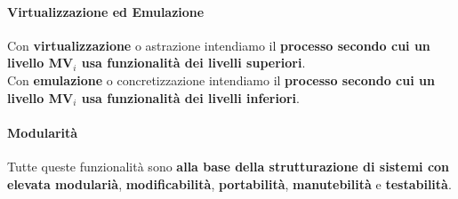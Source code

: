 \documentclass[10pt]{report}
\begin{document}
\paragraph{Virtualizzazione ed Emulazione} Con \textbf{virtualizzazione} o astrazione intendiamo il \textbf{processo secondo cui un livello MV$_{i}$ usa funzionalità dei livelli superiori}.\\
Con \textbf{emulazione} o concretizzazione intendiamo il \textbf{processo secondo cui un livello MV$_{i}$ usa funzionalità dei livelli inferiori}.
\paragraph{Modularità} Tutte queste funzionalità sono \textbf{alla base della strutturazione di sistemi con elevata modularià}, \textbf{modificabilità}, \textbf{portabilità}, \textbf{manutebilità} e \textbf{testabilità}.
\end{document}
